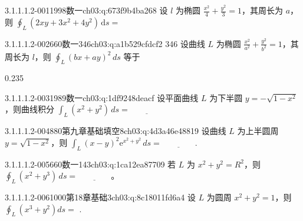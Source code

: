 \par\addvspace{2.4ex}\noindent
\begin{minipage}{\linewidth}

\begin{q}{3.1.1.1.2-001}{1998数一}{ch03:q:673f9b4ba268}
设 $l$ 为椭圆 $\frac{x^2}{4}+\frac{y^2}{3}=1$，其周长为 $a$，则 $\displaystyle \oint_L (2xy+3x^2+4y^2)\,\mathrm{d}s=$ \underline{\hspace{4em}}
\end{q}
\end{minipage}


\begin{q}{3.1.1.1.2-002}{660数一346}{ch03:q:a1b529cfdcf2}
346 设曲线 $L$ 为椭圆 $\frac{x^2}{a^2}+\frac{y^2}{b^2}=1$，其周长为 $l$，则 $\displaystyle \oint_L (bx+ay)^2\,ds$ 等于
\begin{opts}{0.235}
\hfill{}\hfill{}\hfill{}
\end{opts}
\end{q}

\begin{q}{3.1.1.1.2-003}{1989数一}{ch03:q:1df9248deacf}
设平面曲线 $L$ 为下半圆 $y=-\sqrt{1-x^2}$，则曲线积分 $\displaystyle \int_L (x^2+y^2)\,ds = \underline{\hspace{4em}}$
\end{q}

\begin{q}{3.1.1.1.2-004}{880第九章基础填空8}{ch03:q:4d3a46e48819}
设曲线 $L$ 为上半圆周 $y=\sqrt{1-x^2}$，则
$\displaystyle \int_L (x-y)^2 \mathrm{e}^{x^2+y^2}\,ds=\underline{\hspace{4em}}.$
\end{q}

\begin{q}{3.1.1.1.2-005}{660数一143}{ch03:q:1ca12ea87709}
若 $L$ 为 $x^2+y^2=R^2$，则 $\displaystyle \oint_L (x^2+y^3)\,ds = \underline{\hspace{4em}}$。
\end{q}

\begin{q}{3.1.1.1.2-006}{1000第18章基础3}{ch03:q:8c18011fd6a4}
设 $L$ 为圆周 $x^2+y^2=1$，则 $\displaystyle \oint_L (x^3+y^2)ds=$ \underline{\hspace{4em}}.
\end{q}

